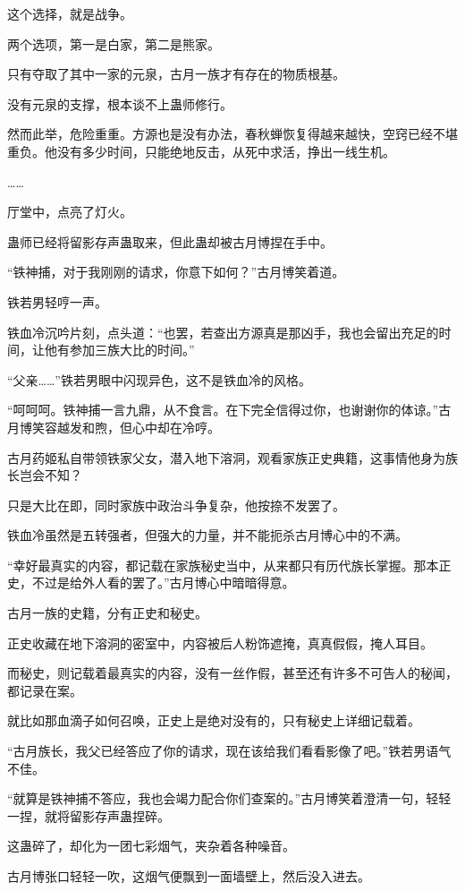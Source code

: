 \begin{this_body}
这个选择，就是战争。

两个选项，第一是白家，第二是熊家。

只有夺取了其中一家的元泉，古月一族才有存在的物质根基。

没有元泉的支撑，根本谈不上蛊师修行。

然而此举，危险重重。方源也是没有办法，春秋蝉恢复得越来越快，空窍已经不堪重负。他没有多少时间，只能绝地反击，从死中求活，挣出一线生机。

……

厅堂中，点亮了灯火。

蛊师已经将留影存声蛊取来，但此蛊却被古月博捏在手中。

“铁神捕，对于我刚刚的请求，你意下如何？”古月博笑着道。

铁若男轻哼一声。

铁血冷沉吟片刻，点头道：“也罢，若查出方源真是那凶手，我也会留出充足的时间，让他有参加三族大比的时间。”

“父亲……”铁若男眼中闪现异色，这不是铁血冷的风格。

“呵呵呵。铁神捕一言九鼎，从不食言。在下完全信得过你，也谢谢你的体谅。”古月博笑容越发和煦，但心中却在冷哼。

古月药姬私自带领铁家父女，潜入地下溶洞，观看家族正史典籍，这事情他身为族长岂会不知？

只是大比在即，同时家族中政治斗争复杂，他按捺不发罢了。

铁血冷虽然是五转强者，但强大的力量，并不能扼杀古月博心中的不满。

“幸好最真实的内容，都记载在家族秘史当中，从来都只有历代族长掌握。那本正史，不过是给外人看的罢了。”古月博心中暗暗得意。

古月一族的史籍，分有正史和秘史。

正史收藏在地下溶洞的密室中，内容被后人粉饰遮掩，真真假假，掩人耳目。

而秘史，则记载着最真实的内容，没有一丝作假，甚至还有许多不可告人的秘闻，都记录在案。

就比如那血滴子如何召唤，正史上是绝对没有的，只有秘史上详细记载着。

“古月族长，我父已经答应了你的请求，现在该给我们看看影像了吧。”铁若男语气不佳。

“就算是铁神捕不答应，我也会竭力配合你们查案的。”古月博笑着澄清一句，轻轻一捏，就将留影存声蛊捏碎。

这蛊碎了，却化为一团七彩烟气，夹杂着各种噪音。

古月博张口轻轻一吹，这烟气便飘到一面墙壁上，然后没入进去。


\end{this_body}
